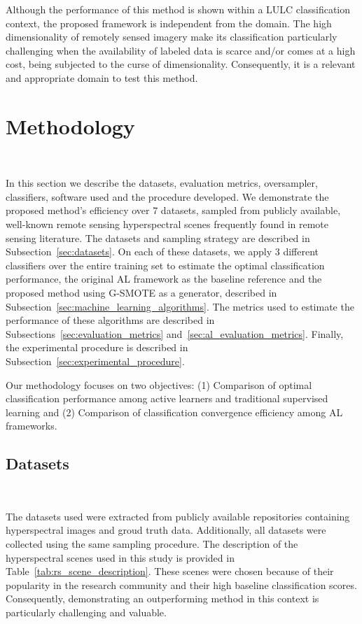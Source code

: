 \documentclass[preprint,12pt]{elsarticle}
\begin{document}
Although the performance of this method is shown within a LULC classification
context, the proposed framework is independent from the domain. The high
dimensionality of remotely sensed imagery make its classification particularly
challenging when the availability of labeled data is scarce and/or comes at a
high cost, being subjected to the curse of dimensionality. Consequently, it is
a relevant and appropriate domain to test this method.

\section{Methodology}~\label{sec:methodology}

In this section we describe the datasets, evaluation metrics, oversampler,
classifiers, software used and the procedure developed. We demonstrate the
proposed method's efficiency over 7 datasets, sampled from publicly available,
well-known remote sensing hyperspectral scenes frequently found in remote
sensing literature. The datasets and sampling strategy are described in
Subsection~\ref{sec:datasets}. On each of these datasets, we apply 3 different
classifiers over the entire training set to estimate the optimal
classification performance, the original AL framework as the baseline
reference and the proposed method using G-SMOTE as a generator, described in
Subsection~\ref{sec:machine_learning_algorithms}. The metrics used to estimate
the performance of these algorithms are described in
Subsections~\ref{sec:evaluation_metrics} and~\ref{sec:al_evaluation_metrics}.
Finally, the experimental procedure is described in
Subsection~\ref{sec:experimental_procedure}. 

Our methodology focuses on two objectives: (1) Comparison of optimal
classification performance among active learners and traditional supervised
learning and (2) Comparison of classification convergence efficiency among AL
frameworks.

\subsection{Datasets}~\label{sec:datasets}

The datasets used were extracted from publicly available repositories
containing hyperspectral images and groud truth data. Additionally, all
datasets were collected using the same sampling procedure. The description of
the hyperspectral scenes used in this study is provided in
Table~\ref{tab:rs_scene_description}. These scenes were chosen because of
their popularity in the research community and their high baseline
classification scores. Consequently, demonstrating an outperforming method in
this context is particularly challenging and valuable.
\end{document}
